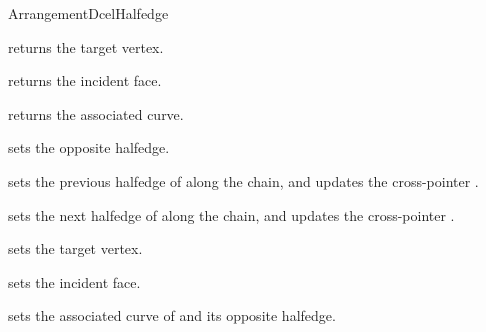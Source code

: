 \begin{ccRefConcept}{ArrangementDcelHalfedge}
{  
    {returns the target vertex.}

    {returns the incident face.}

    {returns the associated curve.}

\ccModifiers

    {sets the opposite halfedge.}

    {sets the previous halfedge of \ccVar{} along the chain,
     and updates the cross-pointer .}

    {sets the next halfedge of \ccVar{} along the chain,
     and updates the cross-pointer .}

    {sets the target vertex.}

    {sets the incident face.}

    {sets the associated curve of \ccVar{} and its opposite halfedge.}

} %

\ccSeeAlso

     \\
     \\

\end{ccRefConcept}  

\ccRefPageEnd
